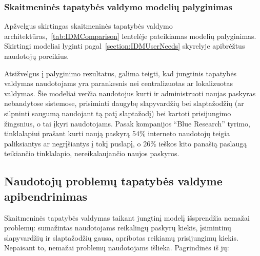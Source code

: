 \subsubsection{Skaitmeninės tapatybės valdymo modelių palyginimas}

Apžvelgus skirtingas skaitmeninės tapatybės valdymo architektūras,\hypertarget{tab:IDMComparison}{~\ref{tab:IDMComparison}} lentelėje pateikiamas modelių palyginimas.
Skirtingi modeliai lyginti pagal\hypertarget{section:IDMUserNeeds}{~\ref{section:IDMUserNeeds}} skyrelyje apibrėžtus naudotojų poreikius. 

Atsižvelgus į palyginimo rezultatus, galima teigti, kad jungtinis tapatybės valdymas naudotojams yra parankesnis nei centralizuotas
ar lokalizuotas valdymas. Šie modeliai verčia naudotojus kurti ir administruoti naujas paskyras nebandytose sistemose,
prisiminti daugybę slapyvardžių bei slaptažodžių (ar silpninti saugumą naudojant tą patį slaptažodį) bei kartoti prisijungimo žingsnius,
o tai įkyri naudotojams. Pasak kompanijos \enquote{Blue Research} tyrimo, tinklalapiui prašant kurti naują paskyrą 54\% interneto naudotojų
teigia paliksiantys ar negrįšiantys į tokį puslapį, o 26\% ieškos kito panašią paslaugą teikiančio tinklalapio, nereikalaujančio naujos paskyros. 



\subsection{Naudotojų problemų tapatybės valdyme apibendrinimas} \label{IDM:problemsSummarized}

Skaitmeninės tapatybės valdymas taikant jungtinį modelį išsprendžia nemažai problemų: sumažintas
naudotojams reikalingų paskyrų kiekis, įsimintinų slapyvardžių ir slaptažodžių gausa, apribotas
reikiamų prisijungimų kiekis. Nepaisant to, nemažai problemų naudotojams išlieka. Pagrindinės iš jų:


